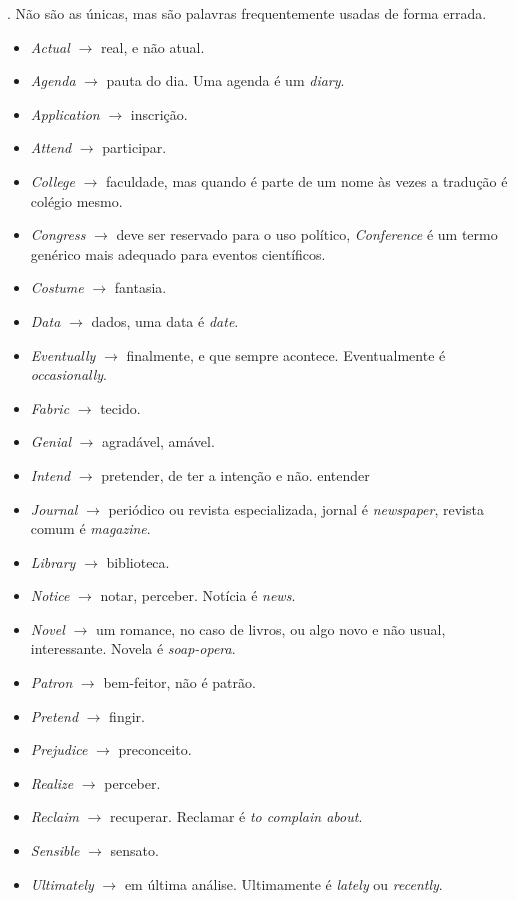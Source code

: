 \documentclass[openany]{book}
\begin{document}

. Não são as únicas, mas são palavras frequentemente usadas de forma errada.
\begin{itemize}
    \item \textit{Actual} $\rightarrow$ real, e não atual.
    \item \textit{Agenda} $\rightarrow$ pauta do dia. Uma agenda é um \textit{diary}.
    \item \textit{Application} $\rightarrow$ inscrição.
    \item \textit{Attend} $\rightarrow$ participar.
    \item \textit{College} $\rightarrow$ faculdade, mas quando é parte de um nome às vezes a tradução é colégio mesmo.
    \item \textit{Congress} $\rightarrow$ deve ser reservado para o uso político, \textit{Conference} é um termo genérico mais adequado para eventos científicos.
    \item \textit{Costume} $\rightarrow$ fantasia.
    \item \textit{Data} $\rightarrow$ dados, uma data é \textit{date}.
    \item \textit{Eventually} $\rightarrow$ finalmente, e que sempre acontece. Eventualmente é \textit{occasionally}.
    \item \textit{Fabric} $\rightarrow$ tecido.
    \item \textit{Genial} $\rightarrow$ agradável, amável.
    \item \textit{Intend} $\rightarrow$ pretender, de ter a intenção e não. entender
    \item \textit{Journal} $\rightarrow$ periódico ou revista especializada, jornal é \textit{newspaper}, revista comum é \textit{magazine}.
    \item \textit{Library} $\rightarrow$ biblioteca.
    \item \textit{Notice} $\rightarrow$ notar, perceber. Notícia é \textit{news}.
    \item \textit{Novel} $\rightarrow$ um romance, no caso de livros, ou algo novo e não usual, interessante. Novela é \textit{soap-opera}.
    \item \textit{Patron} $\rightarrow$ bem-feitor, não é patrão.
    \item \textit{Pretend} $\rightarrow$ fingir.
    \item \textit{Prejudice} $\rightarrow$ preconceito.
    \item \textit{Realize} $\rightarrow$ perceber.
    \item \textit{Reclaim} $\rightarrow$ recuperar. Reclamar é \textit{to complain about}.
    \item \textit{Sensible} $\rightarrow$ sensato.
    \item \textit{Ultimately} $\rightarrow$ em última análise. Ultimamente é \textit{lately} ou \textit{recently}.
    \end{itemize}
\end{document}
